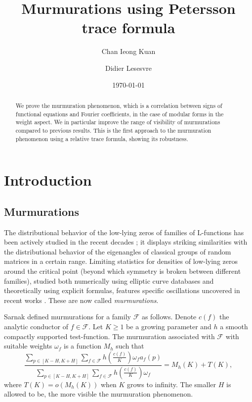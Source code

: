 \documentclass[reqno, 12pt]{amsart}
\title{Murmurations using Petersson trace formula}
\author[C. I. Kuan]{Chan Ieong Kuan}
\author[D. Lesesvre]{Didier Lesesvre}
\date{\today}
\begin{document}
\maketitle

\begin{abstract}
We prove the murmuration phenomenon, which is a correlation between signs of functional equations and Fourier coefficients, in the case of modular forms in the weight aspect. We in particular improve the range of visibility of murmurations compared to previous results. This is the first approach to the murmuration phenomenon using a relative trace formula, showing its robustness.
\end{abstract}

\section{Introduction}

\subsection{Murmurations}

The distributional behavior of the low-lying zeros of families of L-functions has been actively studied in the recent decades \cite{sarnak_families_2016}; it displays striking similarities with the distributional behavior of the eigenangles of classical groups of random matrices in a certain range. 
Limiting statistics for densities of low-lying zeros around the critical point (beyond which symmetry is broken between different families), studied both numerically using elliptic curve databases and theoretically using explicit formulas, features specific oscillations uncovered in recent works \cite{bober_murmurations_2023, he_murmurations_2023, zubrilina_murmurations_2023}. These are now called \textit{murmurations}. 


Sarnak \cite{sarnak_letter} defined murmurations for a family $\mathcal{F}$ as follows. Denote $c(f)$ the analytic conductor of $f \in \mathcal{F}$. Let $K \geqslant 1$ be a growing parameter and $h$ a smooth compactly supported test-function. The murmuration associated with $\mathcal{F}$ with suitable weights $\omega_f$ is a function $M_h$ such that
\begin{equation}
\label{murmuration-sarnak}
\frac{\displaystyle \sum_{p \in [K-H,K+H]} \sum_{f \in \mathcal{F}} h\left( \frac{c(f)}{K} \right) \omega_f a_f(p)}{\displaystyle \sum_{p \in [K-H,K+H]} \sum_{f \in \mathcal{F}} h\left( \frac{c(f)}{K} \right) \omega_f} = M_h\left( K \right) + T(K), 
\end{equation}
where $T(K) =o(M_h(K))$ when $K$ grows to infinity. The smaller $H$ is allowed to be, the more visible the murmuration phenomenon.
\end{document}
